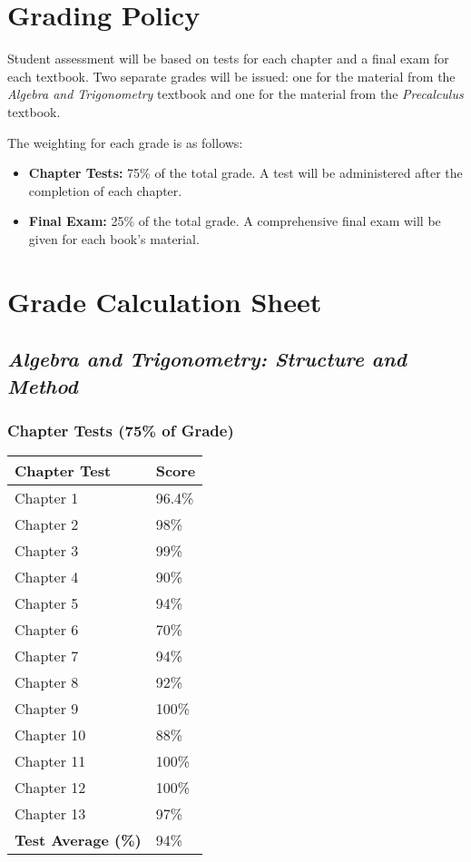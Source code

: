 \documentclass[11pt, letterpaper]{article}
\begin{document}
\section*{Grading Policy}
Student assessment will be based on tests for each chapter and a final exam for each textbook. Two separate grades will be issued: one for the material from the \textit{Algebra and Trigonometry} textbook and one for the material from the \textit{Precalculus} textbook.

The weighting for each grade is as follows:
\begin{itemize}
    \item \textbf{Chapter Tests:} 75\% of the total grade. A test will be administered after the completion of each chapter.
    \item \textbf{Final Exam:} 25\% of the total grade. A comprehensive final exam will be given for each book's material.
\end{itemize}

\newpage
\section*{Grade Calculation Sheet}

\subsection*{\textit{Algebra and Trigonometry: Structure and Method}}
\subsubsection*{Chapter Tests (75\% of Grade)}
\begin{tabular}{|p{6cm}|p{3cm}|}
\hline
\textbf{Chapter Test} & \textbf{Score} \\
\hline
Chapter 1 & 96.4\% \\ \hline
Chapter 2 & 98\% \\ \hline
Chapter 3 & 99\% \\ \hline
Chapter 4 & 90\% \\ \hline
Chapter 5 & 94\% \\ \hline
Chapter 6 & 70\% \\ \hline
Chapter 7 & 94\% \\ \hline
Chapter 8 & 92\% \\ \hline
Chapter 9 & 100\% \\ \hline
Chapter 10 & 88\% \\ \hline
Chapter 11 & 100\% \\ \hline
Chapter 12 & 100\% \\ \hline
Chapter 13 & 97\% \\ \hline
\textbf{Test Average (\%)} & 94\% \\
\hline
\end{tabular}
\end{document}
